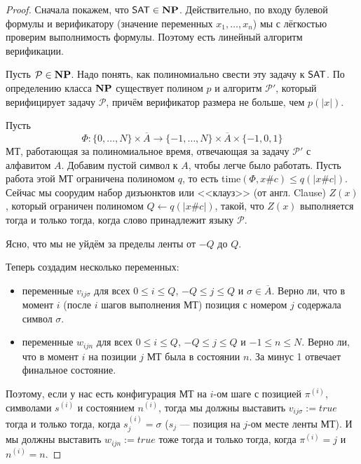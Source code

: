 \begin{proof}
  Сначала покажем, что $\mathsf{SAT} \in \mathbf{NP}$. Действительно, по входу булевой
  формулы и верификатору (значение переменных $x_1, \ldots, x_n$) мы с лёгкостью
  проверим выполнимость формулы. Поэтому есть линейный алгоритм верификации.

  Пусть $\mathcal{P} \in \mathbf{NP}$. Надо понять, как полиномиально свести
  эту задачу к $\mathsf{SAT}$. По определению класса $\mathbf{NP}$ существует полином
  $p$ и алгоритм $\mathcal{P'}$, который верифицирует задачу $\mathcal{P}$, 
  причём верификатор размера не больше, чем $p(|x|)$.

  Пусть
  \[
    \Phi : \{0, \ldots, N\} \times \overline{A} \to \{-1, \ldots, N\}
    \times \overline{A} \times \{-1, 0, 1\}
  \]
  МТ, работающая за полиномиальное время, отвечающая за задачу $\mathcal{P'}$
  с алфавитом $A$. Добавим пустой символ к $A$, чтобы легче было работать.
  Пусть работа этой МТ ограничена полиномом $q$, то есть time$(\Phi, x\#c)
  \leqslant q(|x\#c|)$. Сейчас мы соорудим набор дизъюнктов или <<клауз>>
  (от англ. Clause) $Z(x)$, который
  ограничен полиномом $Q \gets q(|x\#c|)$, такой, что $Z(x)$ выполняется
  тогда и только тогда, когда слово принадлежит языку $\mathcal{P}$.

  Ясно, что мы не уйдём за пределы ленты от $-Q$ до $Q$.

  Теперь создадим несколько переменных:
  \begin{itemize}
    \item переменные $v_{ij\sigma}$ для всех $0 \leqslant i \leqslant Q$,
    $-Q \leqslant j \leqslant Q$ и $\sigma \in \overline{A}$. Верно ли, что
    в момент $i$ (после $i$ шагов выполнения МТ) позиция с номером $j$ содержала
    символ $\sigma$.

    \item переменные $w_{ijn}$ для всех $0 \leqslant i \leqslant Q$,
    $-Q \leqslant j \leqslant Q$ и $-1 \leqslant n \leqslant N$. Верно ли, что
    в момент $i$ на позиции $j$ МТ была в состоянии $n$. За минус 1 отвечает
    финальное состояние.
  \end{itemize}

  Поэтому, если у нас есть конфигурация МТ на $i$-ом шаге
  с позицией $\pi^{(i)}$, символами $s^{(i)}$ и состоянием $n^{(i)}$, тогда
  мы должны выставить $v_{ij\sigma} := true$ тогда и только тогда, когда
  $s_j^{(i)} = \sigma$ ($s_j$ --- позиция на $j$-ом месте ленты МТ). И мы должны
  выставить $w_{ijn} := true$ тоже тогда и только тогда, когда $\pi^{(i)} = j$ и
  $n^{(i)} = n$.


\end{proof}
